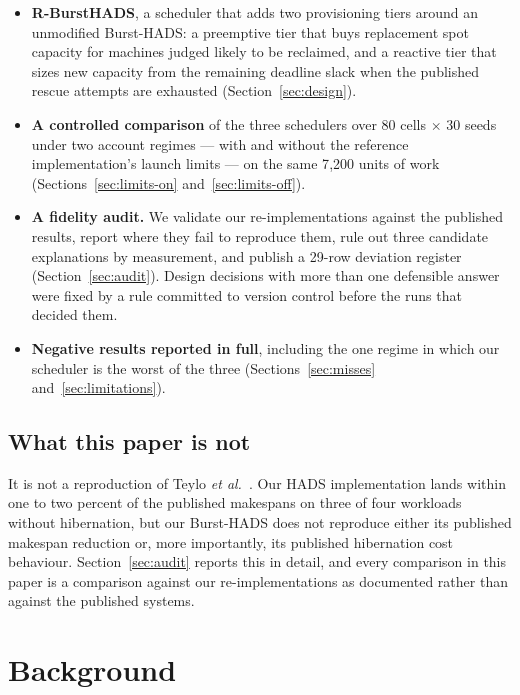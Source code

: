 \documentclass[conference]{IEEEtran}
\begin{document}
\begin{itemize}
\item \textbf{R-BurstHADS}, a scheduler that adds two provisioning tiers around
an unmodified Burst-HADS: a preemptive tier that buys replacement spot capacity
for machines judged likely to be reclaimed, and a reactive tier that sizes new
capacity from the remaining deadline slack when the published rescue attempts
are exhausted (Section~\ref{sec:design}).

\item \textbf{A controlled comparison} of the three schedulers over 80 cells
$\times$ 30 seeds under two account regimes --- with and without the reference
implementation's launch limits --- on the same 7{,}200 units of work
(Sections~\ref{sec:limits-on} and~\ref{sec:limits-off}).

\item \textbf{A fidelity audit.} We validate our re-implementations against the
published results, report where they fail to reproduce them, rule out three
candidate explanations by measurement, and publish a 29-row deviation register
(Section~\ref{sec:audit}). Design decisions with more than one defensible answer
were fixed by a rule committed to version control before the runs that decided
them.

\item \textbf{Negative results reported in full}, including the one regime in
which our scheduler is the worst of the three
(Sections~\ref{sec:misses} and~\ref{sec:limitations}).
\end{itemize}

\subsection{What this paper is not}

It is not a reproduction of Teylo \emph{et al.}~\cite{teylo2023}. Our HADS
implementation lands within one to two percent of the published makespans on
three of four workloads without hibernation, but our Burst-HADS does not
reproduce either its published makespan reduction or, more importantly, its
published hibernation cost behaviour. Section~\ref{sec:audit} reports this in
detail, and every comparison in this paper is a comparison against our
re-implementations as documented rather than against the published systems.

\section{Background}
\end{document}
